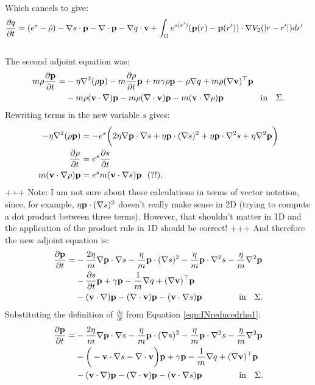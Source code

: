 Which cancels to give:
\begin{align*}
& \frac{\partial q}{\partial t} = (e^s - \hat \rho)  - \nabla s \cdot \mathbf{p} -\nabla\cdot \mathbf{p}  -  \nabla q \cdot \mathbf{v}   + \int_\Omega  e^{s(r')}(\mathbf{p}(r) - \mathbf{p}(r')) \cdot\nabla V_2(|r-r'|)   dr' 
\end{align*}
\\
The second adjoint equation was:
\begin{align*}
m\rho \frac{\partial \mathbf{p}}{\partial t} =& - \eta \nabla^2 (\rho \mathbf{p}) - m \frac{\partial \rho}{\partial t} \mathbf{p}   +m \gamma \rho \mathbf{p}-\rho\nabla q +m \rho (\nabla \mathbf{v})^\top\mathbf{p} \\
&-m \rho (\mathbf{v} \cdot \nabla)\mathbf{p} - m \rho (\nabla \cdot \mathbf{v})\mathbf{p}  - m (\mathbf{v} \cdot \nabla \rho)\mathbf{p}  \ \qquad\qquad \text{in} \quad \Sigma.
\end{align*}
Rewriting terms in the new variable $s$ gives:
\begin{align*}
- \eta \nabla^2 (\rho \mathbf{p}) &= - e^s \bigg(2 \eta \nabla \mathbf{p} \cdot \nabla s + \eta \mathbf{p} \cdot (\nabla s)^2 + \eta \mathbf{p} \cdot \nabla^2 s + \eta \nabla^2 \mathbf{p}    \bigg)\\
\frac{\partial \rho}{\partial t} &= e^s \frac{\partial s}{\partial t}\\
m (\mathbf{v} \cdot \nabla \rho) \mathbf{p} &= e^s m (\mathbf{v} \cdot \nabla s) \mathbf{p} \ \ (?!).
\end{align*}
+++ Note: I am not sure about these calculations in terms of vector notation, since, for example, $\eta \mathbf{p} \cdot (\nabla s)^2$ doesn't really make sense in 2D (trying to compute a dot product between three terms). However, that shouldn't matter in 1D and the application of the product rule in 1D should be correct! +++
And therefore the new adjoint equation is:
\begin{align*}
\frac{\partial \mathbf{p}}{\partial t} =& 
- \frac{2 \eta}{m} \nabla \mathbf{p} \cdot \nabla s - \frac{\eta}{m} \mathbf{p} \cdot (\nabla s)^2 - \frac{\eta}{m} \mathbf{p} \cdot \nabla^2 s - \frac{\eta}{m} \nabla^2 \mathbf{p} \\
 &- \frac{\partial s}{\partial t} \mathbf{p}   +\gamma  \mathbf{p}-\frac{1}{m} \nabla q + (\nabla \mathbf{v})^\top\mathbf{p} \\
&- (\mathbf{v} \cdot \nabla)\mathbf{p} -  (\nabla \cdot \mathbf{v})\mathbf{p}  -  (\mathbf{v} \cdot \nabla s)\mathbf{p}  \ \qquad\qquad \text{in} \quad \Sigma.
\end{align*}
Substituting the definition of $\frac{\partial s}{\partial t} $ from Equation \ref{eqn:INreducedrho1}:
\begin{align*}
\frac{\partial \mathbf{p}}{\partial t} =& 
- \frac{2 \eta}{m} \nabla \mathbf{p} \cdot \nabla s - \frac{\eta}{m} \mathbf{p} \cdot (\nabla s)^2 - \frac{\eta}{m} \mathbf{p} \cdot \nabla^2 s - \frac{\eta}{m} \nabla^2 \mathbf{p} \\
&- \bigg(- \mathbf{v} \cdot \nabla s - \nabla \cdot \mathbf{v}\bigg)\mathbf{p}   +\gamma  \mathbf{p}-\frac{1}{m} \nabla q + (\nabla \mathbf{v})^\top\mathbf{p} \\
&- (\mathbf{v} \cdot \nabla)\mathbf{p} -  (\nabla \cdot \mathbf{v})\mathbf{p}  -  (\mathbf{v} \cdot \nabla s)\mathbf{p}  \ \qquad\qquad \text{in} \quad \Sigma.
\end{align*}
